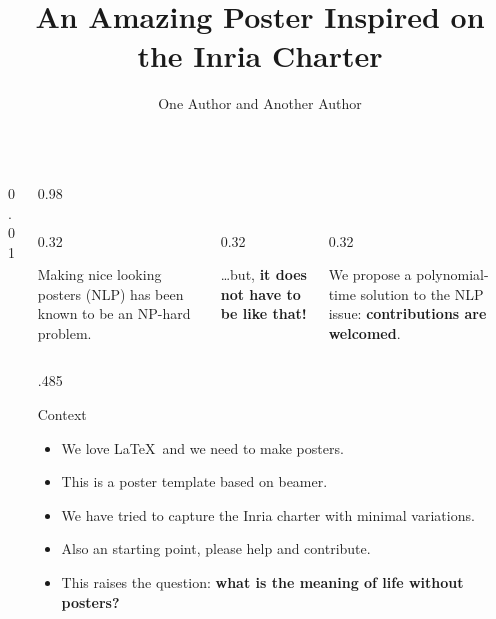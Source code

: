 \documentclass[final,svgnames,english]{beamer}
\title{An Amazing Poster Inspired on the Inria Charter}
\author{One Author and Another Author}
\institute[]{Inria Chile Research Center, Las Condes, Santiago, Chile. \url{https://inria.cl} --- \url{first.last@inria.cl}}
\begin{document}
\begin{frame}[fragile]{}
\vspace{-2em}
\begin{columns}[T]
    \begin{column}{0.01\linewidth}
    \end{column}

    \begin{column}{0.98\linewidth}
        \begin{columns}[t]
            \begin{column}{0.32\linewidth}
                \begin{inriablock}{}
                    \large Making nice looking posters (NLP) has been known to be an NP-hard problem.\raggedright
                \end{inriablock}
            \end{column}%
            \begin{column}{0.32\linewidth}
                \begin{inriablock}{}
                    \large \ldots but, \tcblower \large \textbf{it does not have to be like that!}
                \end{inriablock}
            \end{column}%
            \begin{column}{0.32\linewidth}
                \begin{inriablock}{}
                    \large We propose a polynomial-time solution to the NLP issue: \textcolor{inria-rouge}{\textbf{contributions are welcomed}}.
                \end{inriablock}
            \end{column}
        \end{columns}
        \begin{columns}[T]
            \begin{column}{.485\linewidth}
            \begin{inriastartblock}{Context}
                \begin{itemize}
                    \item We love \LaTeX\ and we need to make posters.
                    \item This is a poster template based on beamer.
                    \item We have tried to capture the Inria charter with minimal variations.
                    \item Also an starting point, please help and contribute.
                    \item This raises the question: \textbf{what is the meaning of life without posters?}
                \end{itemize}
            \end{inriastartblock}
            

\end{column}
\end{columns}
\end{column}
\end{columns}
\end{frame}
\end{document}
